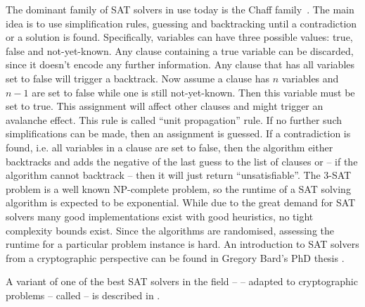 The dominant family of SAT solvers in use today is the Chaff family~\cite{bard-phd}. The main idea is to use simplification rules,  guessing and backtracking until a contradiction or a solution is found. Specifically, variables can have three possible values: true, false and not-yet-known. Any clause containing a true variable can be discarded, since  it doesn't encode any further information. Any clause that has all variables set to false will trigger a backtrack. Now assume a clause has $n$ variables and $n-1$ are set to false while one is still not-yet-known. Then this variable must be set to true. This assignment will affect other clauses and might trigger an avalanche effect. This rule is called ``unit propagation'' rule. If no further such simplifications can be made, then an assignment is guessed. If a contradiction is found, i.e. all variables in a clause are set to false, then the algorithm either backtracks and adds the negative of the last guess to the list of clauses or -- if the algorithm cannot backtrack -- then it will just return ``unsatisfiable''. The 3-SAT problem is a well known NP-complete problem, so the runtime of a SAT solving algorithm is expected to be exponential.  While due to the great demand for SAT solvers many good implementations exist with good heuristics, no tight complexity bounds exist. Since the algorithms are randomised, assessing the runtime for a particular problem instance is hard. An introduction to SAT solvers from a cryptographic perspective can be found in Gregory Bard's PhD thesis \cite{bard-phd}.

A variant of one of the best SAT solvers in the field --  -- adapted to cryptographic problems -- called \CryptoMiniSat -- is described in \cite{SNC09}.

